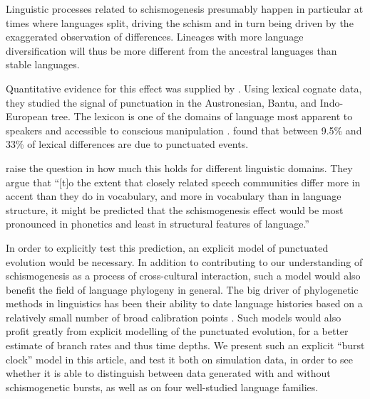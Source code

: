 \documentclass[a4paper,12pt]{scrartcl}
\begin{document}
Linguistic processes related to schismogenesis presumably happen in particular
at times where languages split, driving the schism and in turn being driven by
the exaggerated observation of differences. Lineages with more language
diversification will thus be more different from the ancestral languages than
stable languages.

Quantitative evidence for this effect was supplied by
\textcite{atkinson2008languages}. Using lexical cognate data, they studied the
signal of punctuation in the Austronesian, Bantu, and Indo-European tree. The
lexicon is one of the domains of language most apparent to speakers and
accessible to conscious manipulation \textcite{}.
 found that between 9.5\% and 33\% of lexical
differences are due to punctuated events.



\Textcite{gray2013three} raise the question in how much this holds for
different linguistic domains. They argue that “[t]o the extent that closely
related speech communities differ more in accent than they do in vocabulary, and
more in vocabulary than in language structure, it might be predicted that the
schismogenesis effect would be most pronounced in phonetics and least in
structural features of language.”

In order to explicitly test this prediction, an explicit model of punctuated
evolution would be necessary. In addition to contributing to our understanding
of schismogenesis as a process of cross-cultural interaction, such a model would
also benefit the field of language phylogeny in general. The big driver of
phylogenetic methods in linguistics has been their ability to date language
histories based on a relatively small number of broad calibration points
\parencite{}. Such models would also profit greatly from explicit modelling of
the punctuated evolution, for a better estimate of branch rates and thus time
depths. We present such an explicit “burst clock” model in this article, and
test it both on simulation data, in order to see whether it is able to
distinguish between data generated with and without schismogenetic bursts, as
well as on four well-studied language families.
\end{document}
